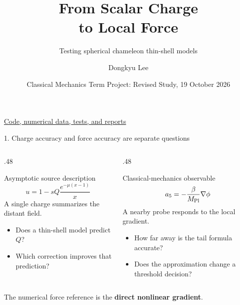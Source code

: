 \documentclass[10pt,aspectratio=169]{beamer}
\title{From Scalar Charge\\to Local Force}
\subtitle{Testing spherical chameleon thin-shell models}
\author{Dongkyu Lee}
\institute{Department of Physics and Astronomy, Seoul National University}
\date{Classical Mechanics Term Project: Revised Study, 19 October 2026}
\begin{document}
\begingroup
{}
\begin{frame}[plain]
 \titlepage
 \centering\scriptsize
 \href{https://github.com/Lasqui-Ponto/Mechanics_Term_Project/tree/agent/improve-chameleon-project/Thin_Shell_Study}{\color{white!80}Code, numerical data, tests, and reports}
\end{frame}
\endgroup

\begin{frame}{1. Charge accuracy and force accuracy are separate questions}
 \begin{columns}[T,onlytextwidth]
 \begin{column}{.48\textwidth}
  \begin{block}{Asymptotic source description}
   \[u=1-sQ\frac{e^{-\mu(x-1)}}x\]
   A single charge summarizes the distant field.
  \end{block}
  \begin{itemize}
   \item Does a thin-shell model predict $Q$?
   \item Which correction improves that prediction?
  \end{itemize}
 \end{column}
 \begin{column}{.48\textwidth}
  \begin{block}{Classical-mechanics observable}
   \[a_5=-\frac{\beta}{M_{\rm Pl}}\nabla\phi\]
   A nearby probe responds to the local gradient.
  \end{block}
  \begin{itemize}
   \item How far away is the tail formula accurate?
   \item Does the approximation change a threshold decision?
  \end{itemize}
 \end{column}
 \end{columns}
 \vfill\centering\small
 The numerical force reference is the \textbf{direct nonlinear gradient}.
\end{frame}
\end{document}
